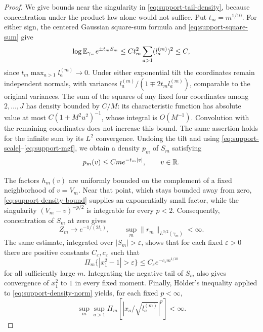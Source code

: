 \begin{proof}
We give bounds near the singularity in
\eqref{eq:support-tail-density}, because concentration under the
product law alone would not suffice.  Put $t_m=m^{1/10}$.  For either
sign, the centered Gaussian square-sum formula and
\eqref{eq:support-square-sum} give
\begin{equation}\label{eq:support-mgf}
 \log\mathbb E_{\gamma_m}e^{\pm t_m S_m}
 \le C t_m^2\sum_{a>1}(l_a^{(m)})^2\le C,
\end{equation}
since $t_m\max_{a>1}l_a^{(m)}\to0$.
Under either exponential tilt the coordinates remain independent
normals, with variances
$l_a^{(m)}/(1\mp2t_m l_a^{(m)})$, comparable to the original
variances.  The sum of the squares of any fixed four coordinates among
$2,\ldots,J$ has density bounded by $C/M$: its characteristic function
has absolute value at most $C(1+M^2u^2)^{-1}$, whose integral is
$O(M^{-1})$.  Convolution with the remaining coordinates does not
increase this bound.  The same assertion holds for the infinite sum
by its $L^2$ convergence.  Undoing the tilt and using
\eqref{eq:support-scale}--\eqref{eq:support-mgf}, we obtain a density
$p_m$ of $S_m$ satisfying
\begin{equation}\label{eq:support-density-bound}
 p_m(v)\le C m e^{-t_m|v|},\qquad v\in\mathbb R.
\end{equation}

The factors $h_m(v)$ are uniformly bounded on the complement of a fixed
neighborhood of $v=V_m$.  Near that point, which stays bounded away
from zero, \eqref{eq:support-density-bound} supplies an exponentially
small factor, while the singularity $(V_m-v)^{-p/2}$ is integrable
for every $p<2$.  Consequently, concentration of $S_m$ at zero gives
\begin{equation}\label{eq:support-density-norm}
 Z_m\longrightarrow e^{-1/(2l_1)},\qquad
 \sup_m\|r_m\|_{L^{3/2}(\gamma_m)}<\infty.
\end{equation}
The same estimate, integrated over $|S_m|>\varepsilon$, shows that
for each fixed $\varepsilon>0$ there are positive constants
$C_\varepsilon,c_\varepsilon$ such that
\begin{equation}\label{eq:support-concentration}
 \Pi_m\{|x_1^2-1|>\varepsilon\}
       \le C_\varepsilon e^{-c_\varepsilon m^{1/10}}
\end{equation}
for all sufficiently large $m$.  Integrating the negative tail of
$S_m$ also gives convergence of $x_1^2$ to $1$ in every fixed moment.
Finally, H\"older's inequality applied to
\eqref{eq:support-density-norm} yields, for each fixed $p<\infty$,
\begin{equation}\label{eq:support-coordinate-moments}
 \sup_{m}\sup_{a>1}
 \Pi_m\left[\left|x_a/\sqrt{l_a^{(m)}}\right|^p\right]<\infty.
\end{equation}


\end{proof}
